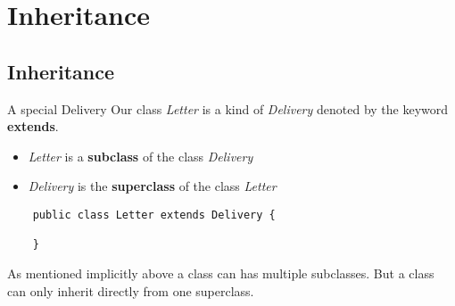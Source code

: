 \begin{comment}
	// an array with 100 elements
	int[][] intArray = new int[10][10];
	
	intArray[0][0] = 0;
	intArray[0][9] = 9;
	intArray[9][9] = 99;
	}
	\end{lstlisting}
\end{frame}

\begin{frame}[fragile]{Assignment with Loops}
	Loops are often used to assign elements in arrays.
	\begin{lstlisting}
	public static void main(String[] args) {
	
	int[][] intArray = new int[10][10];
	
	for(int i = 0; i < 10; i++) {
	for(int j = 0; j < 10; j++) {
	intArray[i][j] = i*10 + j;
	}
	}
	}
	\end{lstlisting}
\end{frame}

\begin{frame}[fragile]{Arrays with objects}
	Loops are often used to assign elements in arrays.
	\begin{lstlisting}
	public static void main(String[] args) {
	
	Student[][] studentArray = new Student[10][10];
	
	for(int i = 0; i < 10; i++) {
	for(int j = 0; j < 10; j++) {
	intArray[i][j] = new Student();
	}
	}
	}
	\end{lstlisting}
\end{frame}
\end{comment}
\section{Inheritance}
\subsection{Inheritance}


\begin{frame}[fragile]{A special Delivery}
	Our class \emph{Letter} is a kind of \emph{Delivery} denoted by the keyword \textbf{extends}.
	\begin{itemize}
		\item \emph{Letter} is a \textbf{subclass} of the class \emph{Delivery}
		\item \emph{Delivery} is the \textbf{superclass} of the class \emph{Letter}
	\end{itemize}
	\begin{lstlisting}
	public class Letter extends Delivery {
	
	}
	\end{lstlisting}
	\vfill
	As mentioned implicitly above a class can has multiple subclasses. 
	But a class can only inherit directly from one superclass.
\end{frame}

